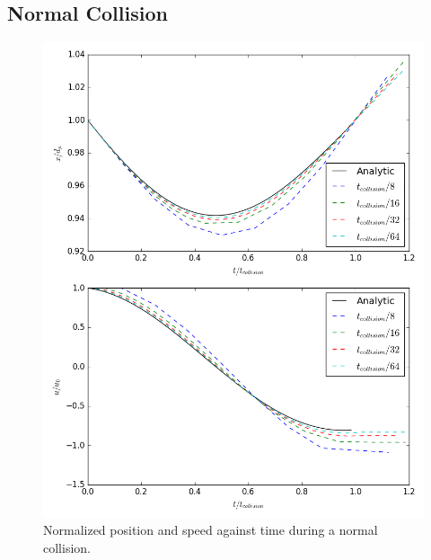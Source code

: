\documentclass[10pt,a4paper,titlepage]{report}
\begin{document}
\subsection{Normal Collision}
\begin{figure}[!htb]
\centering
\includegraphics[scale=0.5]{figures/opencl_verification/normal_force_verification.png}
\caption{Normalized position and speed against time during a normal collision.}
\label{fig:opencl_normal_force_verification}
\end{figure}
\end{document}

